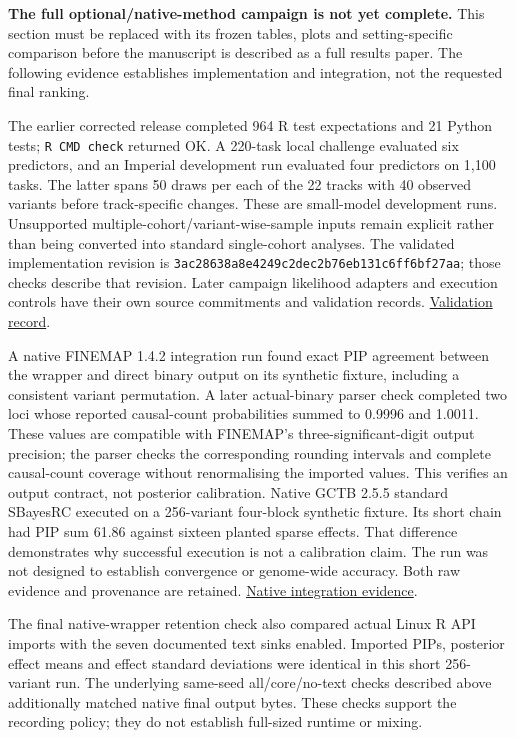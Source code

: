 \documentclass[
  british,
  10pt,
]{article}
\begin{document}
\textbf{The full optional/native-method campaign is not yet complete.}
This section must be replaced with its frozen tables, plots and
setting-specific comparison before the manuscript is described as a full
results paper. The following evidence establishes implementation and
integration, not the requested final ranking.

The earlier corrected release completed 964 R test expectations and 21
Python tests; \texttt{R\ CMD\ check} returned OK. A 220-task local
challenge evaluated six predictors, and an Imperial development run
evaluated four predictors on 1,100 tasks. The latter spans 50 draws per
each of the 22 tracks with 40 observed variants before track-specific
changes. These are small-model development runs. Unsupported
multiple-cohort/variant-wise-sample inputs remain explicit rather than
being converted into standard single-cohort analyses. The validated
implementation revision is
\texttt{3ac28638a8e4249c2dec2b76eb131c6ff6bf27aa}; those checks describe
that revision. Later campaign likelihood adapters and execution controls
have their own source commitments and validation records.
\href{../docs/validation.md}{Validation record}.

A native FINEMAP 1.4.2 integration run found exact PIP agreement between
the wrapper and direct binary output on its synthetic fixture, including
a consistent variant permutation. A later actual-binary parser check
completed two loci whose reported causal-count probabilities summed to
0.9996 and 1.0011. These values are compatible with FINEMAP's
three-significant-digit output precision; the parser checks the
corresponding rounding intervals and complete causal-count coverage
without renormalising the imported values. This verifies an output
contract, not posterior calibration. Native GCTB 2.5.5 standard SBayesRC
executed on a 256-variant four-block synthetic fixture. Its short chain
had PIP sum 61.86 against sixteen planted sparse effects. That
difference demonstrates why successful execution is not a calibration
claim. The run was not designed to establish convergence or genome-wide
accuracy. Both raw evidence and provenance are retained.
\href{../docs/validation-artifacts/README.md}{Native integration
evidence}.

The final native-wrapper retention check also compared actual Linux R
API imports with the seven documented text sinks enabled. Imported PIPs,
posterior effect means and effect standard deviations were identical in
this short 256-variant run. The underlying same-seed all/core/no-text
checks described above additionally matched native final output bytes.
These checks support the recording policy; they do not establish
full-sized runtime or mixing.
\end{document}
